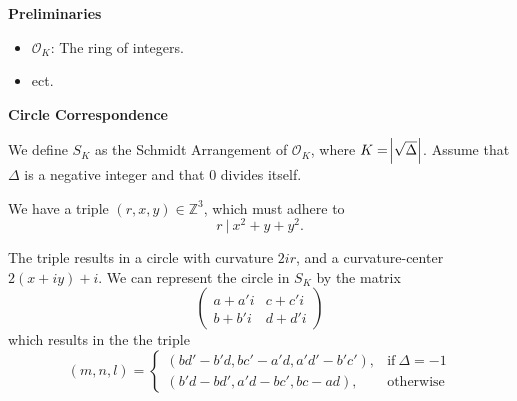 \documentclass[9pt]{article}
\begin{document}
\Large
\textbf{Preliminaries}
\normalsize
\begin{itemize}
	\item $\mathcal{O}_K$: The ring of integers.
	\item ect.
\end{itemize}

\vspace{.3cm}

\Large
\textbf{Circle Correspondence}
\normalsize

We define $S_K$ as the Schmidt Arrangement of $\mathcal{O}_K$, where $K = \abs{\sqrt{\Delta}}$. Assume that $\Delta$ is a negative integer and that $0$ divides itself. 

We have a triple $(r,x,y) \in \mathbb{Z}^3$, which must adhere to 
\begin{equation}
r~|~x^2 + y + y^2.
\end{equation}

The triple results in a circle with curvature $2ir$, and a curvature-center $2(x+iy) + i$. We can represent the circle in $S_K$ by the matrix
\begin{equation}
\begin{pmatrix}
a + a'i & c + c'i \\
b + b'i & d + d'i
\end{pmatrix}
\end{equation}
which results in the the triple
\begin{equation*}
(m,n,l) =
\begin{cases}
(bd' - b'd, bc' - a'd, a'd' - b'c'), & \text{if}~\Delta = -1 \\
(b'd - bd', a'd - bc', bc - ad), & \text{otherwise}
\end{cases}
\end{equation*}
\end{document}
